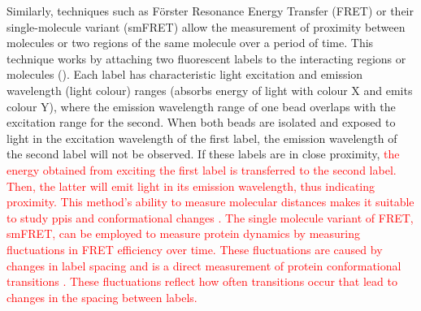 Similarly, techniques such as Förster Resonance Energy Transfer (FRET) or their single-molecule variant (smFRET) allow the measurement of proximity between molecules or two regions of the same molecule over a period of time. This technique works by attaching two fluorescent labels to the interacting regions or molecules (). Each label has characteristic light excitation and emission wavelength (light colour) ranges (absorbs energy of light with colour X and emits colour Y), where the emission wavelength range of one bead overlaps with the excitation range for the second. When both beads are isolated and exposed to light in the excitation wavelength of the first label, the emission wavelength of the second label will not be observed. If these labels are in close proximity, \textcolor{red}{the energy obtained from exciting the first label is transferred to the second label. Then, the latter will emit light in its emission wavelength, thus indicating proximity. This method's ability to measure molecular distances makes it suitable to study \glspl{ppi} and conformational changes \cite{truong_use_2001, heyduk_measuring_2002}.}
\textcolor{red}{The single molecule variant of FRET, smFRET, can be employed to measure protein dynamics by measuring fluctuations in FRET efficiency over time. These fluctuations are caused by changes in label spacing and is a direct measurement of protein conformational transitions \cite{weiss_measuring_2000}. These fluctuations reflect how often transitions occur that lead to changes in the spacing between labels.}

